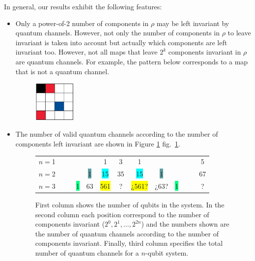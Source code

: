 \documentclass[11pt,dvipsnames]{article} %
\newcommand{\fref}[1]{fig.~\ref{#1}}  \newcommand{\tref}[1]{table~\ref{#1}}
\begin{document}
In general, our results exhibit the following features:
\begin{itemize}
\item Only a power-of-2 number of components in $\rho$ 
may be left invariant by quantum
channels. However, not only the number of components in $\rho$ 
to leave invariant is taken into account but actually 
which components are left invariant too.
However, not all maps that leave $2^{k}$ components invariant in $\rho$
are quantum channels. For example, the pattern below corresponds 
to a map that is not a quantum channel. 
\begin{figure}[H]
	\centering
	\includegraphics[height=2cm]{img/not-cc}
\end{figure}

\item 
The number of valid quantum channels according to the number of components
left invariant are shown in Figure \ref{fig:CCs-by-components} \fref{fig:CCs-by-components}. 

\begin{figure}[H]%
	\centering
	\begin{tabular}{>{$n=$}l<{\hfill}*{12}{c}}
1 &&&&&\colorbox{Apricot}{1}&3&\colorbox{Apricot}{1}&&&&&5\\
2 &&&&\colorbox{CadetBlue}{1}&\colorbox{Cyan}{15}&35&\colorbox{Cyan}{15}&\colorbox{CadetBlue}{1}&&&&67\\
3 &&&\colorbox{SpringGreen}{1}&\colorbox{RedOrange}{63}&\colorbox{Yellow}{561}&?&\colorbox{Yellow}{¿561?}&
\colorbox{RedOrange}{¿63?}&\colorbox{SpringGreen}{1}&&&?
\end{tabular}
\caption{First column shows the number of qubits in the system.  In the second
column each position correspond to the number of components invariant ($2^0,
2^1, \ldots, 2^{2n}$) and the numbers shown are the number of quantum channels
according to the number of components invariant.  Finally, third column
specifies the total number of quantum channels for a $n$-qubit system.}
\label{fig:CCs-by-components}
\end{figure} %


\end{itemize}
\end{document}

